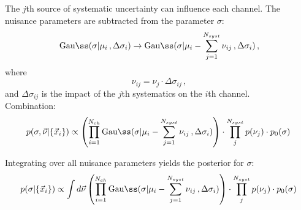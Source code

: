 \documentclass[11pt, a4paper]{article}
\begin{document}
The $j$th source of systematic uncertainty can influence each
channel. The nuisance parameters are subtracted from the parameter
$\sigma$:
%
\begin{equation}
\mathrm{Gau{\ss}}(\sigma|\mu_{i}\, , \Delta \sigma_{i}) \rightarrow \mathrm{Gau{\ss}}(\sigma|\mu_{i}-\sum_{j=1}^{N_{syst}}\nu_{ij}  \, , \Delta \sigma_{i}) \, ,
\end{equation}
%
where
%
\begin{equation}
\nu_{ij} = \nu_{j} \cdot \Delta \sigma_{ij} \, ,
\end{equation}
%
and $\Delta \sigma_{ij}$ is the impact of the $j$th systematics on the $i$th channel. \\

Combination:
%
\begin{eqnarray}
p(\sigma, \vec{\nu}|\{ \vec{x}_{i}\}) & \propto \left( \prod_{i=1}^{N_{ch}} \mathrm{Gau{\ss}}(\sigma|\mu_{i}-\sum_{j=1}^{N_{syst}}\nu_{ij} \, , \Delta \sigma_{i}) \right) \cdot \prod_{j}^{N_{syst}} p(\nu_{j}) \cdot p_{0}(\sigma) \,  \\
\end{eqnarray}

Integrating over all nuisance parameters yields the posterior for $\sigma$:
%
%
\begin{eqnarray}
p(\sigma|\{ \vec{x}_{i}\}) & \propto \int d\vec{\nu} \left( \prod_{i=1}^{N_{ch}} \mathrm{Gau{\ss}}(\sigma|\mu_{i}-\sum_{j=1}^{N_{syst}}\nu_{ij} \, , \Delta \sigma_{i}) \right) \cdot \prod_{j}^{N_{syst}} p(\nu_{j}) \cdot p_{0}(\sigma) \,  \\
\end{eqnarray}
\end{document}
